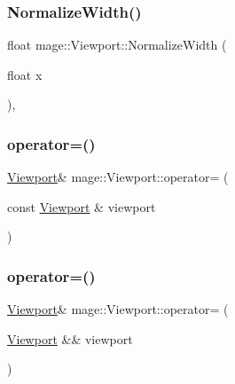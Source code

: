 \hypertarget{structmage_1_1_viewport_ab567840619b22662a66f838f454bb25d}{}\label{structmage_1_1_viewport_ab567840619b22662a66f838f454bb25d} 
\subsubsection{\texorpdfstring{Normalize\+Width()}{NormalizeWidth()}}
{\footnotesize\ttfamily float mage\+::\+Viewport\+::\+Normalize\+Width (\begin{DoxyParamCaption}\item[{float}]{x }\end{DoxyParamCaption})\hspace{0.3cm}{\ttfamily [static]}, {\ttfamily [noexcept]}}

\hypertarget{structmage_1_1_viewport_ab06320c545dd9b71d17e7f8c92fb693c}{}\label{structmage_1_1_viewport_ab06320c545dd9b71d17e7f8c92fb693c} 
\subsubsection{\texorpdfstring{operator=()}{operator=()}\hspace{0.1cm}{\footnotesize\ttfamily [1/2]}}
{\footnotesize\ttfamily \hyperlink{structmage_1_1_viewport}{Viewport}\& mage\+::\+Viewport\+::operator= (\begin{DoxyParamCaption}\item[{const \hyperlink{structmage_1_1_viewport}{Viewport} \&}]{viewport }\end{DoxyParamCaption})\hspace{0.3cm}{\ttfamily [default]}}

\hypertarget{structmage_1_1_viewport_a83ef22f5db0991bc540372d37905524d}{}\label{structmage_1_1_viewport_a83ef22f5db0991bc540372d37905524d} 
\subsubsection{\texorpdfstring{operator=()}{operator=()}\hspace{0.1cm}{\footnotesize\ttfamily [2/2]}}
{\footnotesize\ttfamily \hyperlink{structmage_1_1_viewport}{Viewport}\& mage\+::\+Viewport\+::operator= (\begin{DoxyParamCaption}\item[{\hyperlink{structmage_1_1_viewport}{Viewport} \&\&}]{viewport }\end{DoxyParamCaption})\hspace{0.3cm}{\ttfamily [default]}}

